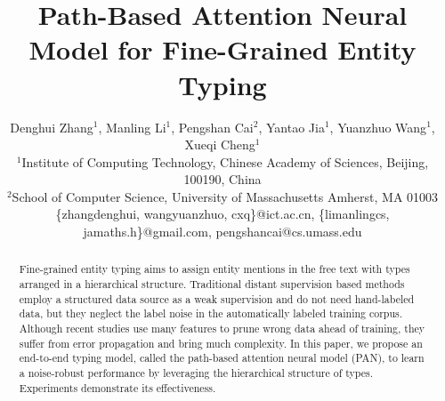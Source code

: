 \documentclass[letterpaper]{article} %
\begin{document}
\title{Path-Based Attention Neural Model for Fine-Grained Entity Typing}
\author{Denghui Zhang$^{1}$, Manling Li$^{1}$, Pengshan Cai$^{2}$, Yantao Jia$^{1}$, Yuanzhuo Wang$^{1}$, Xueqi Cheng$^{1}$\\
$^{1}$Institute of Computing Technology, Chinese Academy of Sciences, Beijing, 100190, China\\
$^{2}$School of Computer Science, University of Massachusetts Amherst, MA 01003\\
\{zhangdenghui, wangyuanzhuo, cxq\}@ict.ac.cn, \{limanlingcs, jamaths.h\}@gmail.com, pengshancai@cs.umass.edu\\
}
\maketitle
\begin{abstract}
Fine-grained entity typing aims to assign entity mentions in the free text with types arranged in a hierarchical structure.
Traditional distant supervision based methods employ a structured data source as a weak supervision and do not need hand-labeled data, but they neglect the label noise in the automatically labeled training corpus.
Although recent studies use many features to prune wrong data ahead of training, they suffer from error propagation and bring much complexity.
In this paper, we propose an end-to-end typing model, called the path-based attention neural model (PAN), to learn a noise-robust performance by leveraging the hierarchical structure of types. Experiments %
demonstrate its effectiveness.
\end{abstract}
\end{document}
